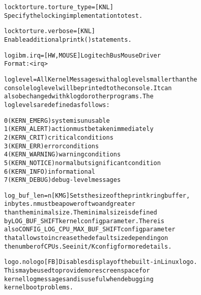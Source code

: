 \documentclass[a4paper,8pt,english]{sphinxmanual}
\begin{document}
\begin{alltt}
        locktorture.torture\_type= {[}KNL{]}
                        Specify the locking implementation to test.

        locktorture.verbose= {[}KNL{]}
                        Enable additional printk() statements.

        logibm.irq=     {[}HW,MOUSE{]} Logitech Bus Mouse Driver
                        Format: \textless{}irq\textgreater{}

        loglevel=       All Kernel Messages with a loglevel smaller than the
                        console loglevel will be printed to the console. It can
                        also be changed with klogd or other programs. The
                        loglevels are defined as follows:

                        0 (KERN\_EMERG)          system is unusable
                        1 (KERN\_ALERT)          action must be taken immediately
                        2 (KERN\_CRIT)           critical conditions
                        3 (KERN\_ERR)            error conditions
                        4 (KERN\_WARNING)        warning conditions
                        5 (KERN\_NOTICE)         normal but significant condition
                        6 (KERN\_INFO)           informational
                        7 (KERN\_DEBUG)          debug-level messages

        log\_buf\_len=n{[}KMG{]}      Sets the size of the printk ring buffer,
                        in bytes.  n must be a power of two and greater
                        than the minimal size. The minimal size is defined
                        by LOG\_BUF\_SHIFT kernel config parameter. There is
                        also CONFIG\_LOG\_CPU\_MAX\_BUF\_SHIFT config parameter
                        that allows to increase the default size depending on
                        the number of CPUs. See init/Kconfig for more details.

        logo.nologo     {[}FB{]} Disables display of the built-in Linux logo.
                        This may be used to provide more screen space for
                        kernel log messages and is useful when debugging
                        kernel boot problems.


\end{alltt}
\end{document}
